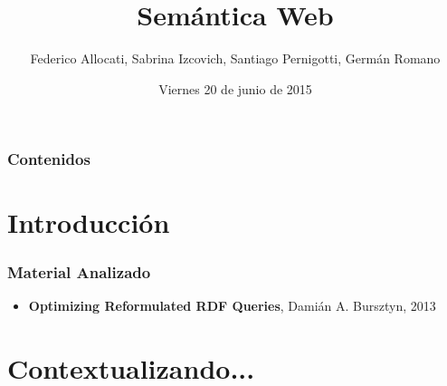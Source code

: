 \documentclass{beamer}
\title[Presentación del TP2]{Semántica Web} %
\author{Federico Allocati, Sabrina Izcovich, Santiago Pernigotti, Germán Romano} %
\institute[] %
{
Departamento de Computación\\ %
\medskip
}
\date{Viernes 20 de junio de 2015} %
\begin{document}
\begin{frame}
\titlepage %
\end{frame}

\begin{frame}
\frametitle{Contenidos} %
\tableofcontents %
\end{frame}


\section{Introducción} 
\begin{frame}
\frametitle{Material Analizado}
\begin{itemize}
\item \textbf{Optimizing Reformulated RDF Queries}, Damián A. Bursztyn, 2013

\end{itemize}
\end{frame}

\section{Contextualizando...} 
\end{document}
